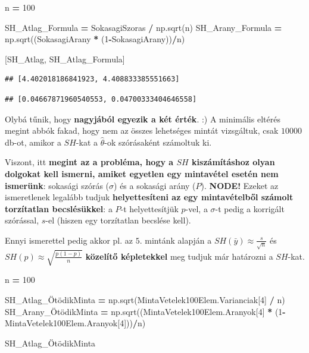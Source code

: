 \documentclass[
]{book}
\newenvironment{Shaded}{\begin{snugshade}}{\end{snugshade}}
\newcommand{\DecValTok}[1]{\textcolor[rgb]{0.00,0.00,0.81}{#1}}
\newcommand{\NormalTok}[1]{#1}
\newcommand{\OperatorTok}[1]{\textcolor[rgb]{0.81,0.36,0.00}{\textbf{#1}}}
\begin{document}
\begin{Shaded}
\begin{Highlighting}[]
\NormalTok{n }\OperatorTok{=} \DecValTok{100}

\NormalTok{SH\_Atlag\_Formula }\OperatorTok{=}\NormalTok{ SokasagiSzoras }\OperatorTok{/}\NormalTok{ np.sqrt(n)}
\NormalTok{SH\_Arany\_Formula }\OperatorTok{=}\NormalTok{ np.sqrt((SokasagiArany }\OperatorTok{*}\NormalTok{ (}\DecValTok{1}\OperatorTok{{-}}\NormalTok{SokasagiArany))}\OperatorTok{/}\NormalTok{n)}

\NormalTok{[SH\_Atlag, SH\_Atlag\_Formula]}
\end{Highlighting}
\end{Shaded}

\begin{verbatim}
## [4.402018186841923, 4.408833385551663]
\end{verbatim}

\begin{Shaded}
\begin{Highlighting}[]
\NormalTok{[SH\_Arany, SH\_Arany\_Formula]}
\end{Highlighting}
\end{Shaded}

\begin{verbatim}
## [0.04667871960540553, 0.04700333404646558]
\end{verbatim}

Olybá tűnik, hogy \textbf{nagyjából egyezik a két érték}. :) A minimális eltérés megint abbók fakad, hogy nem az összes lehetséges mintát vizsgáltuk, csak \(10000\) db-ot, amikor a \(SH\)-kat a \(\hat{\theta}\)-ok szórásaként számoltuk ki.

Viszont, itt \textbf{megint az a probléma, hogy a \(SH\) kiszámításhoz olyan dolgokat kell ismerni, amiket egyetlen egy mintavétel esetén nem ismerünk}: sokasági szórás (\(\sigma\)) és a sokasági arány (\(P\)).
\textbf{NODE!} Ezeket az ismeretlenek legalább tudjuk \textbf{helyettesíteni az egy mintavételből számolt torzítatlan becslésükkel}: a \(P\)-t helyettesítjük \(p\)-vel, a \(\sigma\)-t pedig a korrigált szórással, \(s\)-el (hiszen egy torzítatlan becslése kell).

Ennyi ismerettel pedig akkor pl. az \(5.\) mintánk alapján a \(SH(\bar{y}) \approx \frac{s}{\sqrt{n}}\) és \(SH(p) \approx \sqrt{\frac{p(1-p)}{n}}\) \textbf{közelítő képletekkel} meg tudjuk már határozni a \(SH\)-kat.

\begin{Shaded}
\begin{Highlighting}[]
\NormalTok{n }\OperatorTok{=} \DecValTok{100}

\NormalTok{SH\_Atlag\_ÖtödikMinta }\OperatorTok{=}\NormalTok{ np.sqrt(MintaVetelek100Elem.Varianciak[}\DecValTok{4}\NormalTok{] }\OperatorTok{/}\NormalTok{ n)}
\NormalTok{SH\_Arany\_ÖtödikMinta }\OperatorTok{=}\NormalTok{ np.sqrt((MintaVetelek100Elem.Aranyok[}\DecValTok{4}\NormalTok{] }\OperatorTok{*}\NormalTok{ (}\DecValTok{1}\OperatorTok{{-}}\NormalTok{MintaVetelek100Elem.Aranyok[}\DecValTok{4}\NormalTok{]))}\OperatorTok{/}\NormalTok{n)}

\NormalTok{SH\_Atlag\_ÖtödikMinta}
\end{Highlighting}
\end{Shaded}
\end{document}
